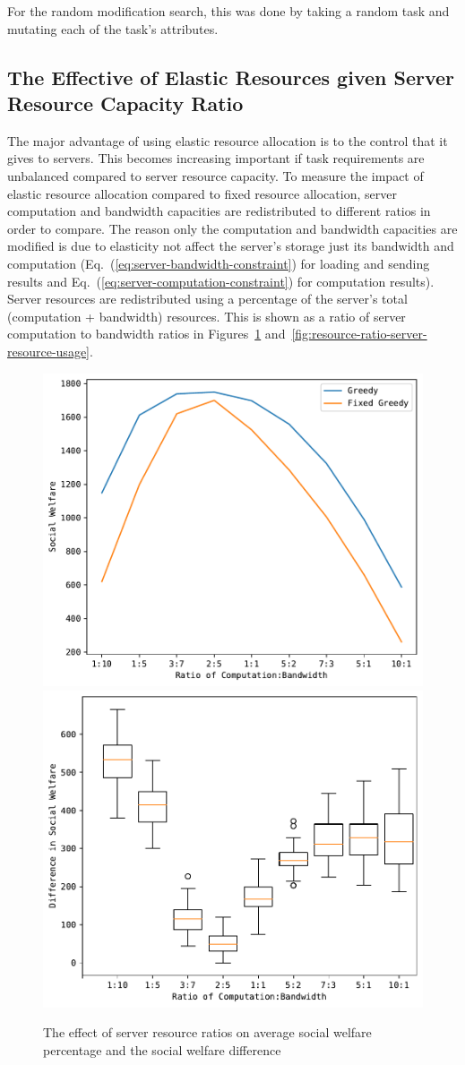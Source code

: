 For the random modification search, this was done by taking a random task and mutating each of the task's attributes.

\subsection{The Effective of Elastic Resources given Server Resource Capacity Ratio}
\label{subsec:the-effective-of-elastic-resources-given-server-resource-capacity-ratio}
The major advantage of using elastic resource allocation is to the control that it gives to servers. This becomes
increasing important if task requirements are unbalanced compared to server resource capacity. To measure the impact
of elastic resource allocation compared to fixed resource allocation, server computation and bandwidth capacities
are redistributed to different ratios in order to compare. The reason only the computation and bandwidth capacities
are modified is due to elasticity not affect the server's storage just its bandwidth and computation
(Eq.~(\ref{eq:server-bandwidth-constraint}) for loading and sending results and Eq.~(\ref{eq:server-computation-constraint})
for computation results). \\
Server resources are redistributed using a percentage of the server's total (computation + bandwidth) resources.
This is shown as a ratio of server computation to bandwidth ratios in Figures~\ref{fig:resource-ratio-social-welfare}
and~\ref{fig:resource-ratio-server-resource-usage}.

\begin{figure}[h]
    \centering
    \includegraphics[width=0.45\linewidth]{figs/resource_ratio/social_welfare.pdf}
    \includegraphics[width=0.45\linewidth]{figs/resource_ratio/social_welfare_difference.pdf}
    \caption{The effect of server resource ratios on average social welfare percentage and the social welfare difference}
    \label{fig:resource-ratio-social-welfare}
\end{figure}


